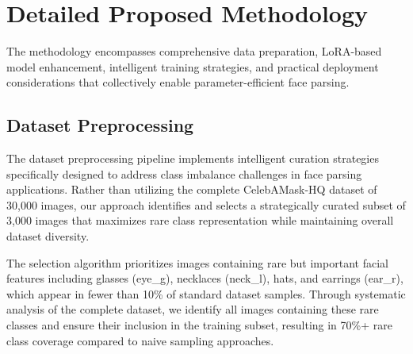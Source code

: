 \documentclass[12pt,a4paper]{report}
\begin{document}
\section{Detailed Proposed Methodology}

The methodology encompasses comprehensive data preparation, LoRA-based model enhancement, intelligent training strategies, and practical deployment considerations that collectively enable parameter-efficient face parsing.

\subsection{Dataset Preprocessing}

The dataset preprocessing pipeline implements intelligent curation strategies specifically designed to address class imbalance challenges in face parsing applications. Rather than utilizing the complete CelebAMask-HQ dataset \cite{lee2020maskgan} of 30,000 images, our approach identifies and selects a strategically curated subset of 3,000 images that maximizes rare class representation while maintaining overall dataset diversity.

The selection algorithm prioritizes images containing rare but important facial features including glasses (eye\_g), necklaces (neck\_l), hats, and earrings (ear\_r), which appear in fewer than 10\% of standard dataset samples. Through systematic analysis of the complete dataset, we identify all images containing these rare classes and ensure their inclusion in the training subset, resulting in 70\%+ rare class coverage compared to naive sampling approaches.
\end{document}
